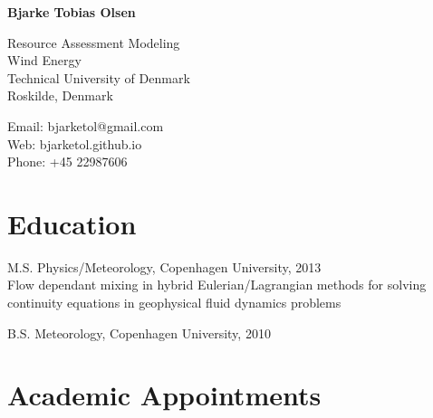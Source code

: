 \documentclass[12pt,letterpaper]{report}
\newcommand{\myname}{Bjarke Tobias Olsen}
\newcommand{\namefont}[1]{{\normalfont\bfseries\Huge{#1}}}
\begin{document}
\raggedright

\namefont{\myname}

\vspace{1em}
\begin{minipage}[t]{0.495\textwidth}
  Resource Assessment Modeling \\
  Wind Energy \\
  Technical University of Denmark \\
  Roskilde, Denmark
\end{minipage}
\begin{minipage}[t]{0.495\textwidth}
  Email: bjarketol@gmail.com \\
  Web: bjarketol.github.io \\
  Phone: +45 22987606
\end{minipage}


\section*{Education}

\begin{tablist}


\item[M.S.]  \tab Physics/Meteorology, Copenhagen University, 2013 \\
				  Flow dependant mixing in hybrid Eulerian/Lagrangian methods for solving
				  continuity equations in geophysical fluid dynamics problems

\item[B.S.]  \tab Meteorology, Copenhagen University, 2010


\end{tablist}



\section*{Academic Appointments}
\end{document}

